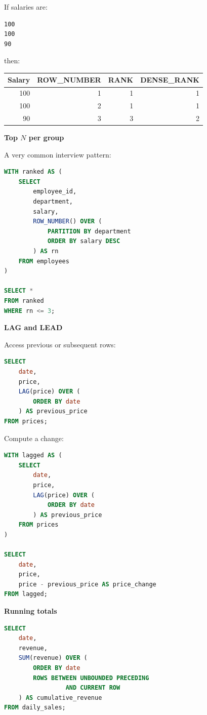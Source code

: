 \documentclass[11pt,letterpaper]{article}
\begin{document}
If salaries are:

\begin{lstlisting}
100
100
90
\end{lstlisting}

then:

\begin{center}
\begin{tabular}{rrrr}
\toprule
Salary & ROW\_NUMBER & RANK & DENSE\_RANK \\
\midrule
100 & 1 & 1 & 1 \\
100 & 2 & 1 & 1 \\
90  & 3 & 3 & 2 \\
\bottomrule
\end{tabular}
\end{center}

\textbf{Top $N$ per group}

A very common interview pattern:

\begin{lstlisting}[language=SQL]
WITH ranked AS (
    SELECT
        employee_id,
        department,
        salary,
        ROW_NUMBER() OVER (
            PARTITION BY department
            ORDER BY salary DESC
        ) AS rn
    FROM employees
)

SELECT *
FROM ranked
WHERE rn <= 3;
\end{lstlisting}

\textbf{LAG and LEAD}

Access previous or subsequent rows:

\begin{lstlisting}[language=SQL]
SELECT
    date,
    price,
    LAG(price) OVER (
        ORDER BY date
    ) AS previous_price
FROM prices;
\end{lstlisting}

Compute a change:

\begin{lstlisting}[language=SQL]
WITH lagged AS (
    SELECT
        date,
        price,
        LAG(price) OVER (
            ORDER BY date
        ) AS previous_price
    FROM prices
)

SELECT
    date,
    price,
    price - previous_price AS price_change
FROM lagged;
\end{lstlisting}

\textbf{Running totals}

\begin{lstlisting}[language=SQL]
SELECT
    date,
    revenue,
    SUM(revenue) OVER (
        ORDER BY date
        ROWS BETWEEN UNBOUNDED PRECEDING
                 AND CURRENT ROW
    ) AS cumulative_revenue
FROM daily_sales;
\end{lstlisting}
\end{document}
